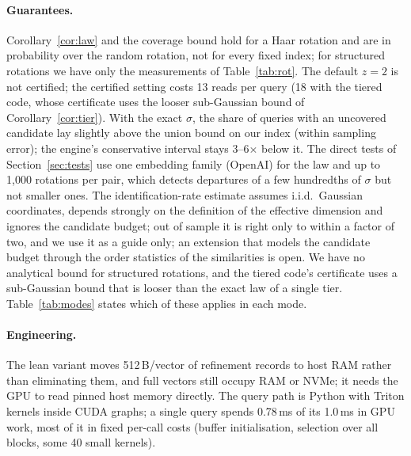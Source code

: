 \documentclass[fleqn,10pt]{wlscirep}
\begin{document}
\paragraph{Guarantees.} Corollary~\ref{cor:law} and the coverage bound hold for a Haar rotation and are in probability over the random rotation, not for every fixed index; for structured rotations we have only the measurements of Table~\ref{tab:rot}. The default $z=2$ is not certified; the certified setting costs 13 reads per query (18 with the tiered code, whose certificate uses the looser sub-Gaussian bound of Corollary~\ref{cor:tier}). With the exact $\sigma$, the share of queries with an uncovered candidate lay slightly above the union bound on our index (within sampling error); the engine's conservative interval stays 3--6$\times$ below it. The direct tests of Section~\ref{sec:tests} use one embedding family (OpenAI) for the law and up to 1{,}000 rotations per pair, which detects departures of a few hundredths of $\sigma$ but not smaller ones. The identification-rate estimate assumes i.i.d.\ Gaussian coordinates, depends strongly on the definition of the effective dimension and ignores the candidate budget; out of sample it is right only to within a factor of two, and we use it as a guide only; an extension that models the candidate budget through the order statistics of the similarities is open. We have no analytical bound for structured rotations, and the tiered code's certificate uses a sub-Gaussian bound that is looser than the exact law of a single tier. Table~\ref{tab:modes} states which of these applies in each mode.

\paragraph{Engineering.} The lean variant moves 512\,B/vector of refinement records to host RAM rather than eliminating them, and full vectors still occupy RAM or NVMe; it needs the GPU to read pinned host memory directly. The query path is Python with Triton kernels inside CUDA graphs; a single query spends 0.78\,ms of its 1.0\,ms in GPU work, most of it in fixed per-call costs (buffer initialisation, selection over all blocks, some 40 small kernels).
\end{document}
